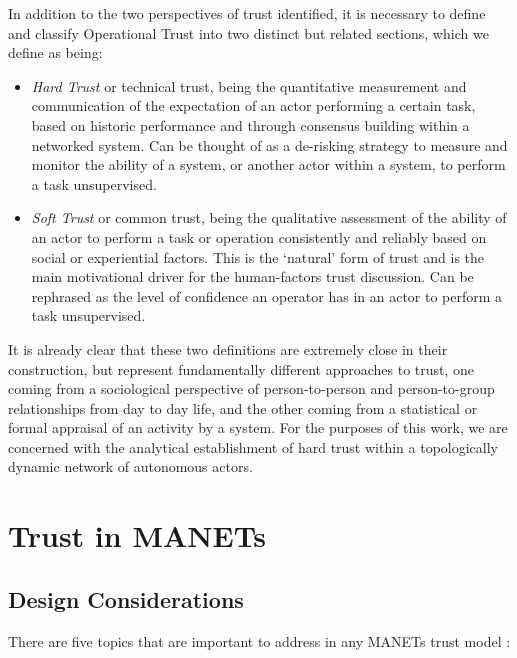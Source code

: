 In addition to the two perspectives of trust identified, it is necessary to define and classify Operational Trust into two distinct but related sections, which we define as being:
\begin{itemize}
  \item \emph{Hard Trust} or technical trust, being the quantitative measurement and communication of the expectation of an actor performing a certain task, based on historic performance and through consensus building within a networked system.
    Can be thought of as a de-risking strategy to measure and monitor the ability of a system, or another actor within a system, to perform a task unsupervised.
  \item \emph{Soft Trust} or common trust, being the qualitative assessment of the ability of an actor to perform a task or operation consistently and reliably based on social or experiential factors.
    This is the ‘natural’ form of trust and is the main motivational driver for the human-factors trust discussion.
    Can be rephrased as the level of confidence an operator has in an actor to perform a task unsupervised.
\end{itemize} 

It is already clear that these two definitions are extremely close in their construction, but represent fundamentally different approaches to trust, one coming from a sociological perspective of person-to-person and person-to-group relationships from day to day life, and the other coming from a statistical or formal appraisal of an activity by a system.
For the purposes of this work, we are concerned with the analytical establishment of hard trust within a topologically dynamic network of autonomous actors.

\section{Trust in MANETs}

\subsection{Design Considerations}

There are five topics that are important to address in any MANETs trust model \cite{Kamvar2003}:

